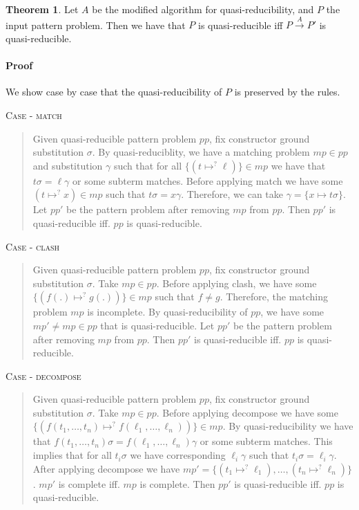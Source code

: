 \documentclass{report}
\theoremstyle{definition}
\newtheorem{theorem_inner}{Theorem}
\newenvironment{theorem}
  {\begin{customblock}\begin{theorem_inner}}
  {\end{theorem_inner}\end{customblock}}
\begin{document}
\begin{theorem}\label{theorem:quasi-reducible}
Let $A$ be the modified algorithm for quasi-reducibility,  and $P$ the input pattern problem. Then we have that $P$ is quasi-reducible iff $P \xrightarrow{A} P'$ is quasi-reducible.

\paragraph{Proof} We show case by case that the quasi-reducibility of $P$ is preserved by the rules.

\textsc{Case - match} 
\begin{quote}
    Given quasi-reducible pattern problem $pp$, fix constructor ground substitution $\sigma$. By quasi-reduciblity, we have a matching problem $mp \in pp$ and substitution $\gamma$ such that for all $\{(t\mapsto^? \ell)\} \in mp$ we have that $t\sigma = \ell\gamma$ or some subterm matches.
    Before applying match we have some $(t \mapsto^? x) \in mp$ such that $t\sigma = x\gamma$. Therefore, we can take $\gamma = \{x \mapsto t\sigma\}$. Let $pp'$ be the pattern problem after removing $mp$ from $pp$. Then $pp'$ is quasi-reducible iff. $pp$ is quasi-reducible.
\end{quote}

\textsc{Case - clash} 
\begin{quote}
    Given quasi-reducible pattern problem $pp$, fix constructor ground substitution $\sigma$. Take $mp \in pp$. Before applying clash, we have some $\{(f(.) \mapsto^? g(.))\} \in mp$ such that $f \neq g$. Therefore, the matching problem $mp$ is incomplete. By quasi-reducibility of $pp$, we have some $mp' \neq mp \in pp$ that is quasi-reducible. Let $pp'$ be the pattern problem after removing $mp$ from $pp$. Then $pp'$ is quasi-reducible iff. $pp$ is quasi-reducible.
\end{quote}

\textsc{Case - decompose} 
\begin{quote}
    Given quasi-reducible pattern problem $pp$, fix constructor ground substitution $\sigma$. Take $mp \in pp$. Before applying decompose we have some $\{(f(t_1, \dots, t_n) \mapsto^? f(\ell_1, \dots, \ell_n))\} \in mp$. By quasi-reducibility we have that $f(t_1, \dots, t_n)\sigma = f(\ell_1, \dots, \ell_n)\gamma$ or some subterm matches. This implies that for all $t_i\sigma$ we have corresponding $\ell_i\gamma$ such that $t_i\sigma=\ell_i\gamma$. After applying decompose we have $mp' = \{(t_1\mapsto^? \ell_1), \dots, (t_n\mapsto^? \ell_n)\}$. $mp'$ is complete iff. $mp$ is complete. Then $pp'$ is quasi-reducible iff. $pp$ is quasi-reducible.
\end{quote}


\end{theorem}
\end{document}
